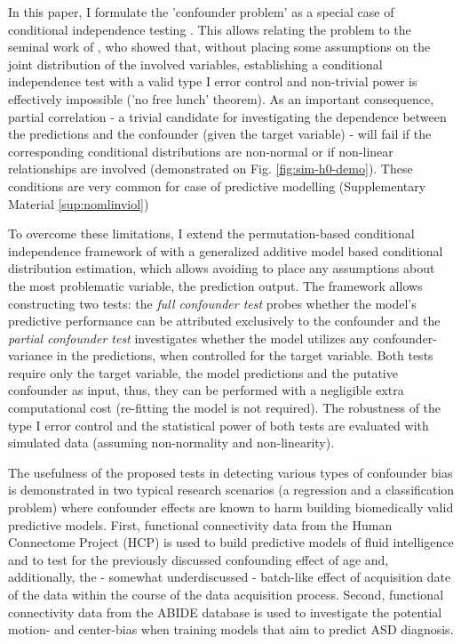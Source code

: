 \documentclass{article}
\begin{document}

In this paper, I formulate the 'confounder problem' as a special case of conditional independence testing \citep{dawid1979conditional}. This allows relating the problem to the seminal work of \cite{shah2020hardness}, who showed that, without placing some assumptions on the joint distribution of the involved variables, establishing a conditional independence test with a valid type I error control and non-trivial power is effectively impossible ('no free lunch' theorem). 
As an important consequence, partial correlation - a trivial candidate for investigating the dependence between the predictions and the confounder (given the target variable) - will fail if the corresponding conditional distributions are non-normal or if non-linear relationships are involved (demonstrated on Fig. \ref{fig:sim-h0-demo}). These conditions are very common for case of predictive modelling \citep{garcia2009study, kristensen2017whole} (Supplementary Material \ref{sup:nomlinviol})

To overcome these limitations, I extend the permutation-based conditional independence framework of \cite{berrett2020conditional} with a generalized additive model based conditional distribution estimation, which allows avoiding to place any assumptions about the most problematic variable, the prediction output. 
The framework allows constructing two tests: the \emph{full confounder test} probes whether the model's predictive performance can be attributed exclusively to the confounder and the \emph{partial confounder test} investigates whether the model utilizes any confounder-variance in the predictions, when controlled for the target variable.
Both tests require only the target variable, the model predictions and the putative confounder as input, thus, they can be performed with a negligible extra computational cost (re-fitting the model is not required).
The robustness of the type I error control and the statistical power of both tests are evaluated with simulated data (assuming non-normality and non-linearity).

The usefulness of the proposed tests in detecting various types of confounder bias is demonstrated in two typical research scenarios (a regression and a classification problem) where confounder effects are known to harm building biomedically valid predictive models. 
First, functional connectivity data from the Human Connectome Project (HCP) \citep{van2013wu} is used to build predictive models of fluid intelligence and to test for the previously discussed confounding effect of age \citep{ dubois2018distributed, lohmann2021predicting} and,  additionally, the - somewhat underdiscussed - batch-like effect of acquisition date of the data within the course of the data acquisition process.
Second, functional connectivity data from the ABIDE \citep{di2014autism} database is used to investigate the potential motion- and center-bias \cite{gotts2013perils, spisak2014voxel, spisak2019optimal} when training models that aim to predict ASD diagnosis.
\end{document}
